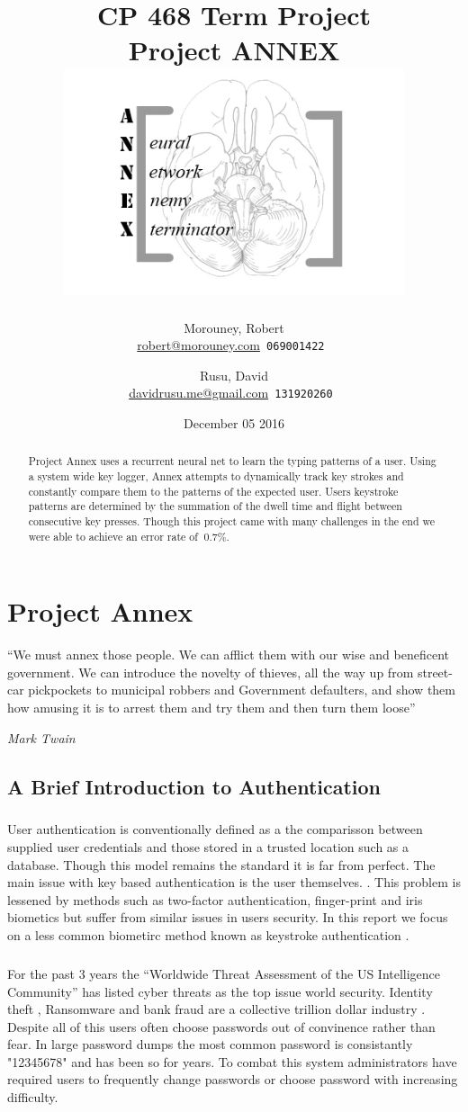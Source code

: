 \documentclass[fancychapters]{report}
\title{CP 468 Term Project \\ Project ANNEX \\ \includegraphics[width=0.75\textwidth]{logo}}
\author{
  Morouney, Robert\\
  \href{mailto:robert@morouney.com}{robert@morouney.com}\texttt{ 069001422 }
   \and
   Rusu, David\\
   \href{mailto:davidrusu.me@gmail.com}{davidrusu.me@gmail.com}\texttt{ 131920260 }
}
\date{December 05 2016}
\begin{document}
  \maketitle
\begin{abstract}
Project Annex uses a recurrent neural net to learn the typing patterns of a user.  Using a system wide key logger, Annex attempts to dynamically track key strokes and constantly compare them to the patterns of the expected user.  Users keystroke patterns are determined by the summation of the dwell time and flight between consecutive key presses. Though this project came with many challenges in the end we were able to achieve an error rate of $~0.7\%$.
\end{abstract}
\tableofcontents
\chapter{Project Annex}
\epigraph{``We must annex those people. We can afflict them 
with our wise and beneficent government. We can introduce 
the novelty of thieves, all the way up from street-car 
pickpockets to municipal robbers and Government defaulters, 
and show them how amusing it is to arrest them and try them and 
then turn them loose''}{ \textit{Mark Twain}}
\section{A Brief Introduction to Authentication}
\paragraph{}User authentication is conventionally defined as a the comparisson between supplied user credentials and those stored in a trusted location such as a database. \cite{AUTH1} 
Though this model remains the standard it is far from perfect. 
The main issue with key based authentication is the user themselves. \cite{BADUSER}. 
This problem is lessened by methods such as two-factor authentication, finger-print and iris biometics but suffer from similar issues in users security.
In this report we focus on a less common biometirc method known as keystroke authentication \cite{BIOKEY1}.   

\paragraph{}For the past 3 years the ``Worldwide Threat Assessment of the US Intelligence Community'' \cite{US2014} \cite{US2015} \cite{US2016} has listed cyber threats as the top issue world security. 
Identity theft \cite{IDENT1}, Ransomware\cite{SRANS1} and bank fraud are a collective trillion dollar industry \cite{IDENT1}.  
Despite all of this users often choose passwords out of convinence rather than fear.  
In large password dumps the most common password is consistantly "12345678" and has been so for years. \cite{COMMONPASSWORD} 
To combat this system administrators have required users 
to frequently change passwords or choose password with increasing difficulty.  
\end{document}

